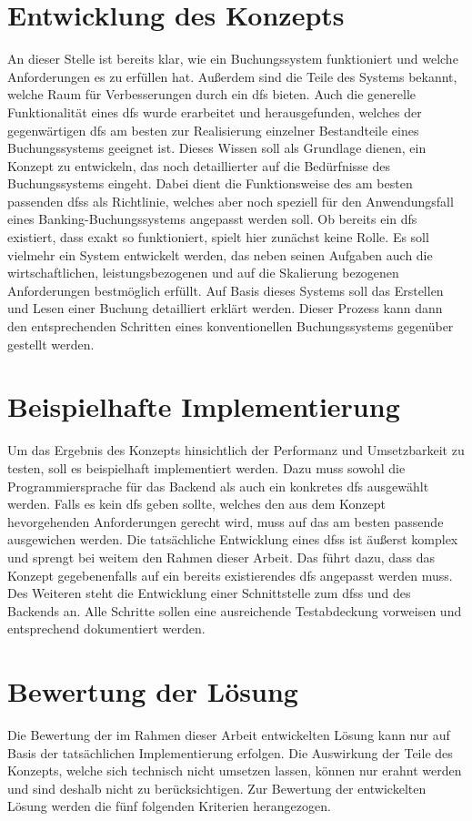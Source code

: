 \documentclass[12pt,oneside,a4paper,parskip]{scrbook}
\begin{document}
\section{Entwicklung des Konzepts}
An dieser Stelle ist bereits klar, wie ein Buchungssystem funktioniert und welche Anforderungen es zu erfüllen hat. Außerdem sind die Teile des Systems bekannt, welche Raum für Verbesserungen durch ein \ac{dfs} bieten. Auch die generelle Funktionalität eines \ac{dfs} wurde erarbeitet und herausgefunden, welches der gegenwärtigen \ac{dfs} am besten zur Realisierung einzelner Bestandteile eines Buchungssystems geeignet ist. Dieses Wissen soll als Grundlage dienen, ein Konzept zu entwickeln, das noch detaillierter auf die Bedürfnisse des Buchungssystems eingeht. Dabei dient die Funktionsweise des am besten passenden \acp{dfs} als Richtlinie, welches aber noch speziell für den Anwendungsfall eines Banking-Buchungssystems angepasst werden soll. Ob bereits ein \ac{dfs} existiert, dass exakt so funktioniert, spielt hier zunächst keine Rolle. Es soll vielmehr ein System entwickelt werden, das neben seinen Aufgaben auch die wirtschaftlichen, leistungsbezogenen und auf die Skalierung bezogenen Anforderungen bestmöglich erfüllt. Auf Basis dieses Systems soll das Erstellen und Lesen einer Buchung detailliert erklärt werden. Dieser Prozess kann dann den entsprechenden Schritten eines konventionellen Buchungssystems gegenüber gestellt werden.

\section{Beispielhafte Implementierung}
Um das Ergebnis des Konzepts hinsichtlich der Performanz und Umsetzbarkeit zu testen, soll es beispielhaft implementiert werden.
Dazu muss sowohl die Programmiersprache für das Backend als auch ein konkretes \ac{dfs} ausgewählt werden. Falls es kein \ac{dfs} geben sollte, welches den aus dem Konzept hevorgehenden Anforderungen gerecht wird, muss auf das am besten passende ausgewichen werden. Die tatsächliche Entwicklung eines \acp{dfs} ist äußerst komplex und sprengt bei weitem den Rahmen dieser Arbeit. Das führt dazu, dass das Konzept gegebenenfalls auf ein bereits existierendes \ac{dfs} angepasst werden muss. Des Weiteren steht die Entwicklung einer Schnittstelle zum \acp{dfs} und des Backends an. Alle Schritte sollen eine ausreichende Testabdeckung vorweisen und entsprechend dokumentiert werden.

\section{Bewertung der Lösung}
Die Bewertung der im Rahmen dieser Arbeit entwickelten Lösung kann nur auf Basis der tatsächlichen Implementierung erfolgen. Die Auswirkung der Teile des Konzepts, welche sich technisch nicht umsetzen lassen, können nur erahnt werden und sind deshalb nicht zu berücksichtigen. Zur Bewertung der entwickelten Lösung werden die fünf folgenden Kriterien herangezogen.
\end{document}
